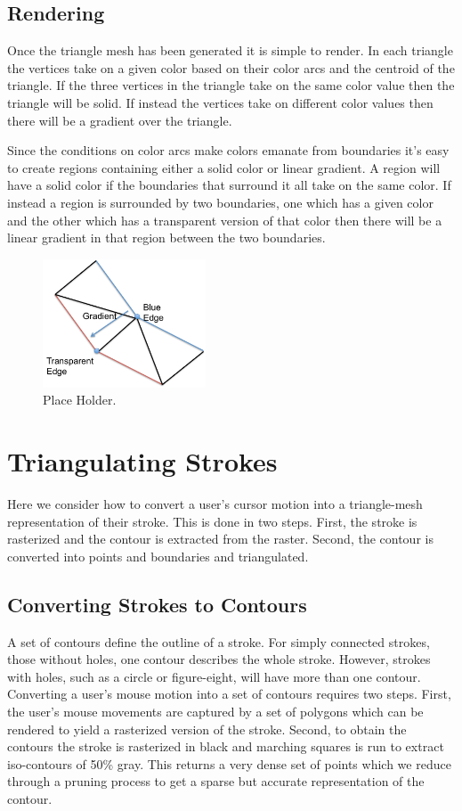 \documentclass[review]{acmsiggraph}
\begin{document}
\subsection{Rendering}
Once the triangle mesh has been generated it is simple to render. In each triangle the vertices
take on a given color based on their color arcs and the centroid of the triangle. If the three
vertices in the triangle take on the same color value then the triangle will be solid. If instead the 
vertices take on different color values then there will be a gradient over the triangle.

Since the conditions on color arcs make colors emanate from boundaries it's easy to create regions
containing either a solid color or linear gradient. A region will have a solid color if the
boundaries that surround it all take on the same color. If instead a region is surrounded by
two boundaries, one which has a given color and the other which has a transparent version of that color
then there will be a linear gradient in that region between the two boundaries.

\begin{figure}
    \centering
        \includegraphics[height=1.5in]{images/softstrokeboundaryedges}
    \caption{Place Holder.}
\end{figure}

\section{Triangulating Strokes}

Here we consider how to convert a user's cursor motion into a triangle-mesh representation
of their stroke. This is done in two steps. First, the stroke is rasterized and the
contour is extracted from the raster. Second, the contour is converted into points and
boundaries and triangulated.

\subsection{Converting Strokes to Contours}
A set of contours define the outline of a stroke. For simply connected strokes, those without holes, 
one contour describes the whole stroke. However, strokes with holes, such as a circle or 
figure-eight, will have more than one contour.
Converting a user's mouse motion into a set of contours requires two steps.
First, the user's mouse movements are captured by a set of polygons which can be
rendered to yield a rasterized version of the stroke.
Second, to obtain the contours the stroke is rasterized in black and marching squares
is run to extract iso-contours of 50\% gray. This returns a very dense set of points 
which we reduce through a pruning process to
get a sparse but accurate representation of the contour.
\end{document}
